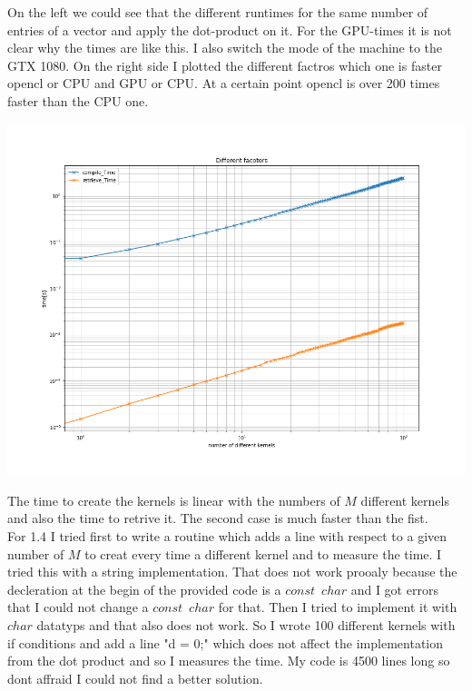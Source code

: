 \documentclass[11pt,a4paper]{article}
\begin{document}
\noindent
On the left we could see that the different runtimes for the same number of entries of a vector and apply the dot-product on it. For the GPU-times it is not clear why the times are like this. I also switch the mode of the machine to the GTX 1080. On the right side I plotted the different factros which one is faster opencl or CPU and GPU or CPU. At a certain point opencl is over 200 times faster than the CPU one.

\begin{center}
	\begin{minipage}[t]{0.49\textwidth}
		\includegraphics[width=\textwidth]{Bilder/Time_to_compile_and_clean}
	\end{minipage}
\end{center}

\noindent
The time to create the kernels is linear with the numbers of $M$ different kernels and also the time to retrive it. The second case is much faster than the fist.\\
For 1.4 I tried first to write a routine which adds a line with respect to a given number of $M$ to creat every time a different kernel and to measure the time. I tried this with a string implementation. That does not work prooaly because the decleration at the begin of the provided code is a $const\,\,\,char$ and I got errors that I could not change a $const\,\,\,char$ for that. Then I tried to implement it with $char$ datatyps and that also does not work. So I wrote 100 different kernels with if conditions and add a line "d = 0;" which does not affect the implementation from the dot product and so I measures the time. My code is 4500 lines long so dont affraid I could not find a better solution.
	
\end{document}
